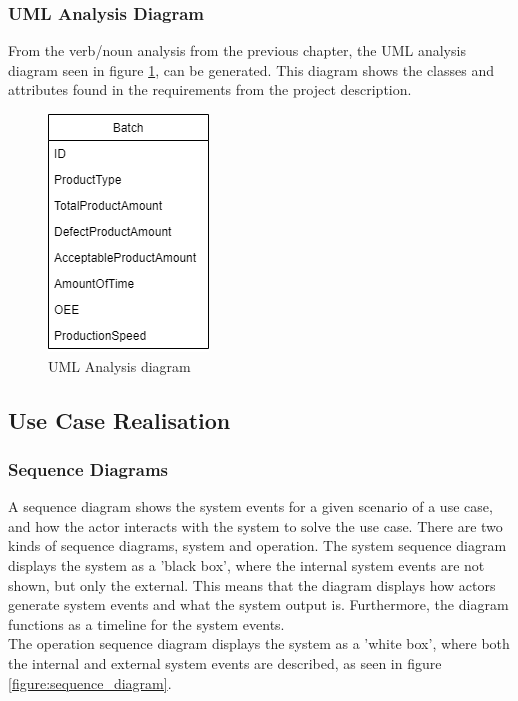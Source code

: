\subsubsection{UML Analysis Diagram}
From the verb/noun analysis from the previous chapter, the UML analysis diagram
seen in figure \ref{figure:analysis_diagram}, can be generated. This diagram
shows the classes and attributes found in the requirements from the project
description.

\begin{figure}[ht]
	\centering 
	\includegraphics[scale=0.6]{images/diagrams/UML_Analysis_Diagram.drawio.png}
	\caption{UML Analysis diagram}
	\label{figure:analysis_diagram} 
\end{figure}

\subsection{Use Case Realisation}

\subsubsection{Sequence Diagrams}
A sequence diagram shows the system events for a given scenario of a use case,
and how the actor interacts with the system to solve the use case. There are two
kinds of sequence diagrams, system and operation. The system sequence diagram
displays the system as a 'black box', where the internal system events are not
shown, but only the external. This means that the diagram displays how actors
generate system events and what the system output is. Furthermore, the diagram
functions as a timeline for the system events. \\

The operation sequence diagram displays the system as a 'white box', where both
the internal and external system events are described, as seen in figure
\ref{figure:sequence_diagram}.

